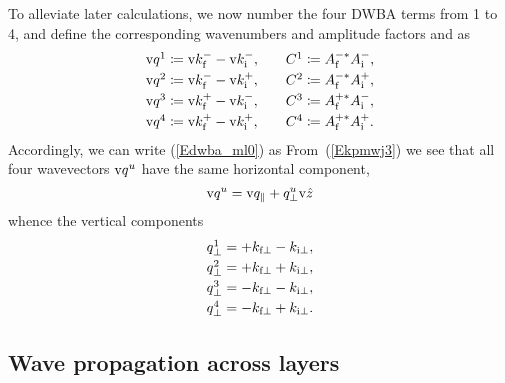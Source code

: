 To alleviate later calculations,
we now number the four DWBA terms from 1 to 4,
and define the corresponding wavenumbers and amplitude factors and as
\begin{equation}
  \begin{array}{l@{\hspace{2em}}l}
    \q^1 \coloneqq  \k^-_\tf - \k^-_\ti,& C^1 \coloneqq  A^{-*}_\tf A^-_\ti, \\[.6ex]
    \q^2 \coloneqq  \k^-_\tf - \k^+_\ti,& C^2 \coloneqq  A^{-*}_\tf A^+_\ti, \\[.6ex]
    \q^3 \coloneqq  \k^+_\tf - \k^-_\ti,& C^3 \coloneqq  A^{+*}_\tf A^-_\ti, \\[.6ex]
    \q^4 \coloneqq  \k^+_\tf - \k^+_\ti,& C^4 \coloneqq  A^{+*}_\tf A^+_\ti.
  \end{array}
\end{equation}
Accordingly, we can write (\ref{Edwba_ml0}) as
From~(\ref{Ekpmwj3}) we see that all four wavevectors $\text{v}{q}^u$
have the same horizontal component,
\begin{equation}\label{Eqpp}
  \text{v}{q}^u = \text{v}{q}_\parallel + q^u_\perp \text{v}{\hat z}
\end{equation}
whence the vertical components
\begin{equation}
    \begin{array}{l}
  q^1_\perp = +k_{\text{f}\perp  } -k_{\text{i}\perp},\\[.6ex]
  q^2_\perp = +k_{\text{f}\perp  } +k_{\text{i}\perp},\\[.6ex]
  q^3_\perp = -k_{\text{f}\perp  } -k_{\text{i}\perp},\\[.6ex]
  q^4_\perp = -k_{\text{f}\perp  } +k_{\text{i}\perp}.
    \end{array}
\end{equation}

\subsection{Wave propagation across layers}\label{Sacrolay}

%
%
%

